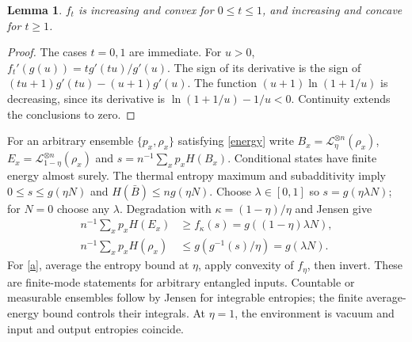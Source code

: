 \documentclass[11pt]{article}
\newtheorem{lemma}[theorem]{Lemma}
\newcommand{\Loss}{\mathcal L}
\begin{document}
\begin{lemma}\label{scalar}
$f_t$ is increasing and convex for $0\le t\le1$, and increasing
and concave for $t\ge1$.
\end{lemma}
\begin{proof}
The cases $t=0,1$ are immediate. For $u>0$,
$f_t'(g(u))=t g'(tu)/g'(u)$. The sign of its derivative is the
sign of $(tu+1)g'(tu)-(u+1)g'(u)$.
The function $(u+1)\ln(1+1/u)$ is decreasing, since its
derivative is $\ln(1+1/u)-1/u<0$.
Continuity extends the conclusions to zero.
\end{proof}
For an arbitrary ensemble $\{p_x,\rho_x\}$ satisfying \eqref{energy}
write $B_x=\Loss_\eta^{\otimes n}(\rho_x)$,
$E_x=\Loss_{1-\eta}^{\otimes n}(\rho_x)$ and
$s=n^{-1}\sum_xp_xH(B_x)$. Conditional states have finite energy
almost surely. The thermal entropy maximum and subadditivity imply
$0\le s\le g(\eta N)$ and $H(\bar B)\le ng(\eta N)$.
Choose $\lambda\in[0,1]$ so $s=g(\eta\lambda N)$; for $N=0$
choose any $\lambda$.
Degradation with $\kappa=(1-\eta)/\eta$ and Jensen give
\begin{align}
 n^{-1}\sum_xp_xH(E_x)&\ge f_\kappa(s)
                 =g((1-\eta)\lambda N),\label{e}\\
 n^{-1}\sum_xp_xH(\rho_x)&\le
          g(g^{-1}(s)/\eta)=g(\lambda N).\label{a}
\end{align}
For \eqref{a}, average the entropy bound at $\eta$, apply convexity
of $f_\eta$, then invert. These are finite-mode statements for
arbitrary entangled inputs. Countable or measurable ensembles follow
by Jensen for integrable entropies; the finite average-energy bound
controls their integrals. At $\eta=1$, the environment is vacuum
and input and output entropies coincide.
\end{document}
